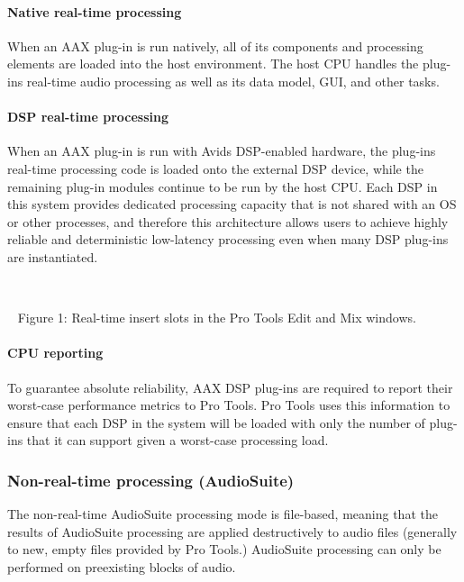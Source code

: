 \hypertarget{a00830_subsubsection__native_realtime_processing_}{}\paragraph{Native real-\/time processing}\label{a00830_subsubsection__native_realtime_processing_}
 When an A\+AX plug-\/in is run natively, all of its components and processing elements are loaded into the host environment. The host C\+PU handles the plug-\/in\textquotesingle{}s real-\/time audio processing as well as its data model, G\+UI, and other tasks.

\hypertarget{a00830_subsubsection__dsp_realtime_processing_}{}\paragraph{D\+S\+P real-\/time processing}\label{a00830_subsubsection__dsp_realtime_processing_}
 When an A\+AX plug-\/in is run with Avid\textquotesingle{}s D\+S\+P-\/enabled hardware, the plug-\/in\textquotesingle{}s real-\/time processing code is loaded onto the external D\+SP device, while the remaining plug-\/in modules continue to be run by the host C\+PU. Each D\+SP in this system provides dedicated processing capacity that is not shared with an OS or other processes, and therefore this architecture allows users to achieve highly reliable and deterministic low-\/latency processing even when many D\+SP plug-\/ins are instantiated.

~

~   Figure 1\+: Real-\/time insert slots in the Pro Tools Edit and Mix windows.

\hypertarget{a00830_subsubsection__cpu_reporting_}{}\paragraph{C\+P\+U reporting}\label{a00830_subsubsection__cpu_reporting_}
 To guarantee absolute reliability, A\+AX D\+SP plug-\/ins are required to report their worst-\/case performance metrics to Pro Tools. Pro Tools uses this information to ensure that each D\+SP in the system will be loaded with only the number of plug-\/ins that it can support given a worst-\/case processing load.

\hypertarget{a00830_subsection__non-real-time_processing_audiosuite}{}\subsubsection{Non-\/real-\/time processing (\+Audio\+Suite)}\label{a00830_subsection__non-real-time_processing_audiosuite}
 The non-\/real-\/time Audio\+Suite processing mode is file-\/based, meaning that the results of Audio\+Suite processing are applied destructively to audio files (generally to new, empty files provided by Pro Tools.) Audio\+Suite processing can only be performed on preexisting blocks of audio.

